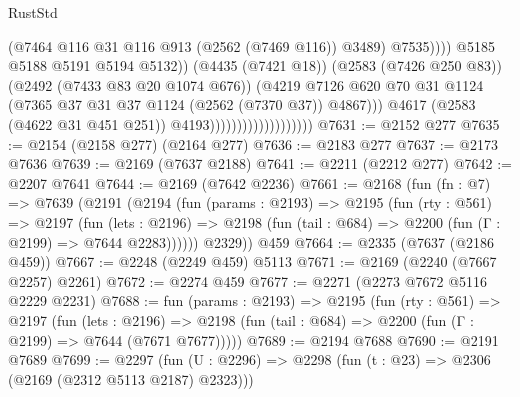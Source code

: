 \begin{lexlean}{RustStd}
\begin{coremodule}
                                                        (@7464
                                                          @116
                                                          @31
                                                          @116
                                                          @913
                                                          (@2562 (@7469 @116))
                                                          @3489)
                                                        @7535))))
                                                @5185
                                                @5188
                                                @5191
                                                @5194
                                                @5132))
                                            (@4435 (@7421 @18))
                                            (@2583 (@7426 @250 @83))
                                            (@2492 (@7433 @83 @20 @1074 @676))
                                            (@4219
                                              @7126
                                              @620
                                              @70
                                              @31
                                              @1124
                                              (@7365 @37 @31 @37 @1124 (@2562 (@7370 @37)) @4867)))
                                          @4617
                                          (@2583 (@4622 @31 @451 @251))
                                          @4193)))))))))))))))))))
@7631 := @2152 @277
@7635 := @2154 (@2158 @277) (@2164 @277)
@7636 := @2183 @277
@7637 := @2173 @7636
@7639 := @2169 (@7637 @2188)
@7641 := @2211 (@2212 @277)
@7642 := @2207 @7641
@7644 := @2169 (@7642 @2236)
@7661 := @2168
    (fun (fn : @7) =>
    @7639
      (@2191
        (@2194
          (fun (params : @2193) =>
          @2195
            (fun (rty : @561) =>
            @2197
              (fun (lets : @2196) =>
              @2198 (fun (tail : @684) => @2200 (fun (Γ : @2199) => @7644 @2283))))))
        @2329))
    @459
@7664 := @2335 (@7637 (@2186 @459))
@7667 := @2248 (@2249 @459) @5113
@7671 := @2169 (@2240 (@7667 @2257) @2261)
@7672 := @2274 @459
@7677 := @2271 (@2273 @7672 @5116 @2229 @2231)
@7688 := fun (params : @2193) =>
  @2195
    (fun (rty : @561) =>
    @2197
      (fun (lets : @2196) =>
      @2198 (fun (tail : @684) => @2200 (fun (Γ : @2199) => @7644 (@7671 @7677)))))
@7689 := @2194 @7688
@7690 := @2191 @7689
@7699 := @2297 (fun (U : @2296) => @2298 (fun (t : @23) => @2306 (@2169 (@2312 @5113 @2187) @2323)))

\end{coremodule}
\end{lexlean}
